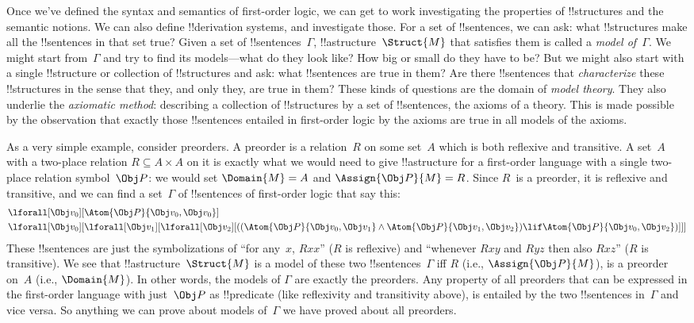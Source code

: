 Once we've defined the syntax and semantics of first-order logic, we
can get to work investigating the properties of !!{structure}s and the
semantic notions. We can also define !!{derivation} systems, and
investigate those.  For a set of !!{sentence}s, we can ask: what
!!{structure}s make all the !!{sentence}s in that set true?  Given a
set of !!{sentence}s~$\Gamma$, !!a{structure}~$\Struct{M}$ that
satisfies them is called a \emph{model of~$\Gamma$}.  We might start
from~$\Gamma$ and try to find its models---what do they look like? How
big or small do they have to be? But we might also start with a single
!!{structure} or collection of !!{structure}s and ask: what
!!{sentence}s are true in them?  Are there !!{sentence}s that
\emph{characterize} these !!{structure}s in the sense that they, and
only they, are true in them? These kinds of questions are the domain
of \emph{model theory}.  They also underlie the \emph{axiomatic
  method}: describing a collection of !!{structure}s by a set of
!!{sentence}s, the axioms of a theory. This is made possible by the
observation that exactly those !!{sentence}s entailed in first-order
logic by the axioms are true in all models of the axioms.

As a very simple example, consider preorders. A preorder is a
relation~$R$ on some set~$A$ which is both reflexive and transitive.
A set~$A$ with a two-place relation $R \subseteq A \times A$ on it is
exactly what we would need to give !!a{structure} for a first-order
language with a single two-place relation symbol~$\Obj P$: we would
set $\Domain{M} = A$ and $\Assign{\Obj P}{M} = R$.  Since $R$~is a
preorder, it is reflexive and transitive, and we can find a
set~$\Gamma$ of !!{sentence}s of first-order logic that say this:
\begin{align*}
  & \lforall[\Obj v_0][\Atom{\Obj P}{\Obj v_0,\Obj v_0}]\\
  & \lforall[\Obj v_0][\lforall[\Obj v_1][\lforall[\Obj v_2][((\Atom{\Obj P}{\Obj v_0,\Obj v_1} \land \Atom{\Obj P}{\Obj v_1,\Obj v_2}) \lif \Atom{\Obj P}{\Obj v_0,\Obj v_2})]]]
\end{align*}
These !!{sentence}s are just the symbolizations of ``for any~$x$,
$Rxx$'' ($R$ is reflexive) and ``whenever $Rxy$ and $Ryz$ then also
$Rxz$'' ($R$ is transitive). We see that !!a{structure}~$\Struct{M}$
is a model of these two !!{sentence}s~$\Gamma$ iff $R$ (i.e.,
$\Assign{\Obj P}{M}$), is a preorder on~$A$ (i.e., $\Domain{M}$). In
other words, the models of $\Gamma$ are exactly the preorders. Any
property of all preorders that can be expressed in the first-order
language with just~$\Obj P$ as !!{predicate} (like reflexivity and
transitivity above), is entailed by the two !!{sentence}s in~$\Gamma$
and vice versa.  So anything we can prove about models of~$\Gamma$ we
have proved about all preorders.

